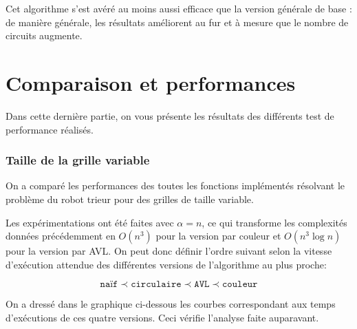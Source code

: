 \documentclass[12pt,a4paper]{article}
\begin{document}
Cet algorithme s'est av\'er\'e au moins aussi efficace que la version 
g\'en\'erale de base : de mani\`ere g\'en\'erale, les r\'esultats 
am\'eliorent au fur et \`a mesure que le nombre de circuits augmente.

\newpage

\part{Comparaison et performances}
Dans cette derni\`ere partie, on vous pr\'esente les r\'esultats des 
diff\'erents test de performance r\'ealis\'es.

\section{Taille de la grille variable}
On a compar\'e les performances des toutes les fonctions 
impl\'ement\'es r\'esolvant le probl\`eme du robot trieur pour des grilles de 
taille variable.

Les exp\'erimentations ont \'et\'e faites avec $\alpha = n$,
ce qui transforme les complexit\'es donn\'ees 
pr\'ec\'edemment en $O(n^3)$ pour la version par couleur et $O(n^3\log n)$ pour 
la version par AVL. On peut donc d\'efinir l'ordre suivant selon la 
vitesse d'ex\'ecution attendue des diff\'erentes versions de l'algorithme au 
plus proche:

\begin{equation*}
  \texttt{na\"if} \prec \texttt{circulaire} \prec \texttt{AVL} \prec 
  \texttt{couleur}
\end{equation*}

On a dress\'e dans le graphique ci-dessous les courbes correspondant aux temps 
d'ex\'ecutions de ces quatre versions. Ceci v\'erifie l'analyse faite 
auparavant.
\end{document}
